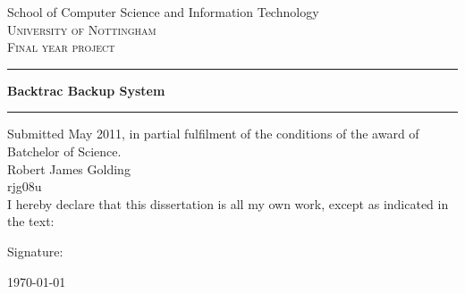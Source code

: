 \begin{center}

{\large School of Computer Science and Information Technology}\\[1.5cm]
\textsc{\LARGE University of Nottingham}\\[1.5cm]

\textsc{\Large Final year project}\\[0.5cm]

\hrule \vspace{0.4cm}
{\huge \bfseries Backtrac Backup System}\\[0.6cm]
\hrule \vspace{1.5cm}

Submitted May 2011, in partial fulfilment of the conditions of the award of
Batchelor of Science. \\[1.5cm]

{\Large Robert James Golding}\\[0.2cm]
{\large rjg08u}\\[1.5cm]


I hereby declare that this dissertation is all my own work, except as indicated
in the text:\\[2.5cm]

\begin{flushleft}
Signature:
\end{flushleft}

\vfill

{\large \today}

\end{center}

